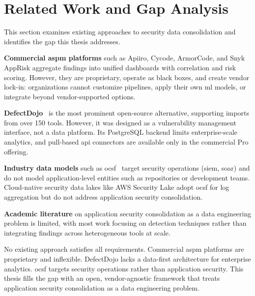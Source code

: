 
\section{Related Work and Gap Analysis}
\label{sec:related-work}

This section examines existing approaches to security data consolidation and identifies the gap this thesis addresses.

\textbf{Commercial \gls{aspm} platforms} such as Apiiro, Cycode, ArmorCode, and Snyk AppRisk aggregate findings into unified dashboards with correlation and risk scoring. However, they are proprietary, operate as black boxes, and create vendor lock-in: organizations cannot customize pipelines, apply their own \gls{ml} models, or integrate beyond vendor-supported options.

\textbf{DefectDojo}~\parencite{DefectDojo2024} is the most prominent open-source alternative, supporting imports from over 150 tools. However, it was designed as a vulnerability management interface, not a data platform. Its PostgreSQL backend limits enterprise-scale analytics, and pull-based \gls{api} connectors are available only in the commercial Pro offering.

\textbf{Industry data models} such as \gls{ocsf}~\parencite{OCSF2024} target security operations (\gls{siem}, \gls{soar}) and do not model application-level entities such as repositories or development teams. Cloud-native security data lakes like AWS Security Lake adopt \gls{ocsf} for log aggregation but do not address application security consolidation.

\textbf{Academic literature} on application security consolidation as a data engineering problem is limited, with most work focusing on detection techniques rather than integrating findings across heterogeneous tools at scale.

No existing approach satisfies all requirements. Commercial \gls{aspm} platforms are proprietary and inflexible. DefectDojo lacks a data-first architecture for enterprise analytics. \gls{ocsf} targets security operations rather than application security. This thesis fills the gap with an open, vendor-agnostic framework that treats application security consolidation as a data engineering problem.
